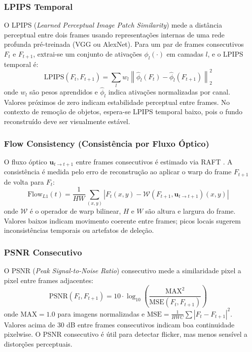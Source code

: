 \documentclass[conference]{IEEEtran}
\begin{document}
\subsubsection{LPIPS Temporal}
O LPIPS (\textit{Learned Perceptual Image Patch Similarity}) mede a distância perceptual entre dois frames usando representações internas de uma rede profunda pré-treinada (VGG ou AlexNet). Para um par de frames consecutivos $F_t$ e $F_{t+1}$, extrai-se um conjunto de ativações $\phi_l(\cdot)$ em camadas $l$, e o LPIPS temporal é:
\begin{equation}
    \mathrm{LPIPS}(F_t, F_{t+1}) = \sum_l w_l \left\| \hat{\phi}_l(F_t) - \hat{\phi}_l(F_{t+1}) \right\|_2^2
\end{equation}
onde $w_l$ são pesos aprendidos e $\hat{\phi}_l$ indica ativações normalizadas por canal. Valores próximos de zero indicam estabilidade perceptual entre frames. No contexto de remoção de objetos, espera-se LPIPS temporal baixo, pois o fundo reconstruído deve ser visualmente estável.

\subsubsection{Flow Consistency (Consistência por Fluxo Óptico)}
O fluxo óptico $\mathbf{u}_{t \to t+1}$ entre frames consecutivos é estimado via RAFT \cite{raft}. A consistência é medida pelo erro de reconstrução ao aplicar o warp do frame $F_{t+1}$ de volta para $F_t$:
\begin{equation}
    \mathrm{Flow}_{L1}(t) = \frac{1}{HW} \sum_{(x,y)} \left| F_t(x,y) - \mathcal{W}(F_{t+1}, \mathbf{u}_{t \to t+1})(x,y) \right|
\end{equation}
onde $\mathcal{W}$ é o operador de warp bilinear, $H$ e $W$ são altura e largura do frame. Valores baixos indicam movimento coerente entre frames; picos locais sugerem inconsistências temporais ou artefatos de deleção.

\subsubsection{PSNR Consecutivo}
O PSNR (\textit{Peak Signal-to-Noise Ratio}) consecutivo mede a similaridade pixel a pixel entre frames adjacentes:
\begin{equation}
    \mathrm{PSNR}(F_t, F_{t+1}) = 10 \cdot \log_{10}\!\left(\frac{\mathrm{MAX}^2}{\mathrm{MSE}(F_t, F_{t+1})}\right)
\end{equation}
onde $\mathrm{MAX} = 1.0$ para imagens normalizadas e $\mathrm{MSE} = \frac{1}{HWC}\sum |F_t - F_{t+1}|^2$. Valores acima de 30 dB entre frames consecutivos indicam boa continuidade pixelwise. O PSNR consecutivo é útil para detectar flicker, mas menos sensível a distorções perceptuais.
\end{document}

